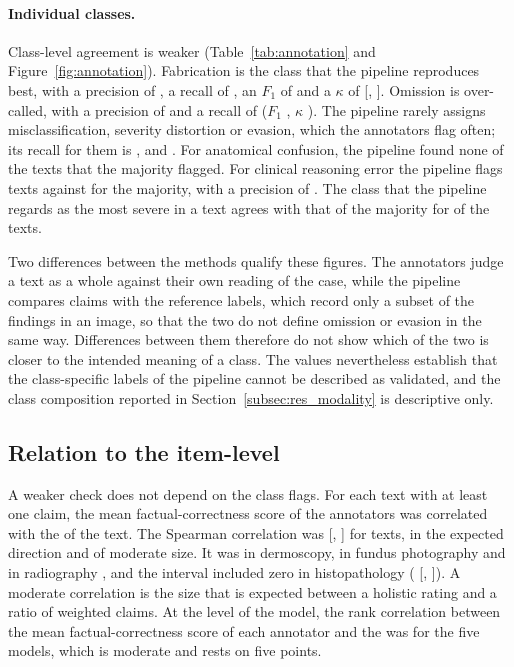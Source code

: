 \paragraph{Individual classes.} Class-level agreement is weaker (Table~\ref{tab:annotation} and Figure~\ref{fig:annotation}). Fabrication is the class that the pipeline reproduces best, with a precision of , a recall of , an $F_1$ of  and a $\kappa$ of  [, ]. Omission is over-called, with a precision of  and a recall of  ($F_1$ , $\kappa$ ). The pipeline rarely assigns misclassification, severity distortion or evasion, which the annotators flag often; its recall for them is ,  and . For anatomical confusion, the pipeline found none of the  texts that the majority flagged. For clinical reasoning error the pipeline flags  texts against  for the majority, with a precision of . The class that the pipeline regards as the most severe in a text agrees with that of the majority for  of the texts.

Two differences between the methods qualify these figures. The annotators judge a text as a whole against their own reading of the case, while the pipeline compares claims with the reference labels, which record only a subset of the findings in an image, so that the two do not define omission or evasion in the same way. Differences between them therefore do not show which of the two is closer to the intended meaning of a class. The values nevertheless establish that the class-specific labels of the pipeline cannot be described as validated, and the class composition reported in Section~\ref{subsec:res_modality} is descriptive only.

\subsection{Relation to the item-level \SMHR{}}\label{sec:val_smhr}
A weaker check does not depend on the class flags. For each text with at least one claim, the mean factual-correctness score of the annotators was correlated with the \SMHR{} of the text. The Spearman correlation was  [, ] for  texts, in the expected direction and of moderate size. It was  in dermoscopy,  in fundus photography and  in radiography \rad{}, and the interval included zero in histopathology ( [, ]). A moderate correlation is the size that is expected between a holistic rating and a ratio of weighted claims. At the level of the model, the rank correlation between the mean factual-correctness score of each annotator and the \SMHR{} was  for the five models, which is moderate and rests on five points.

